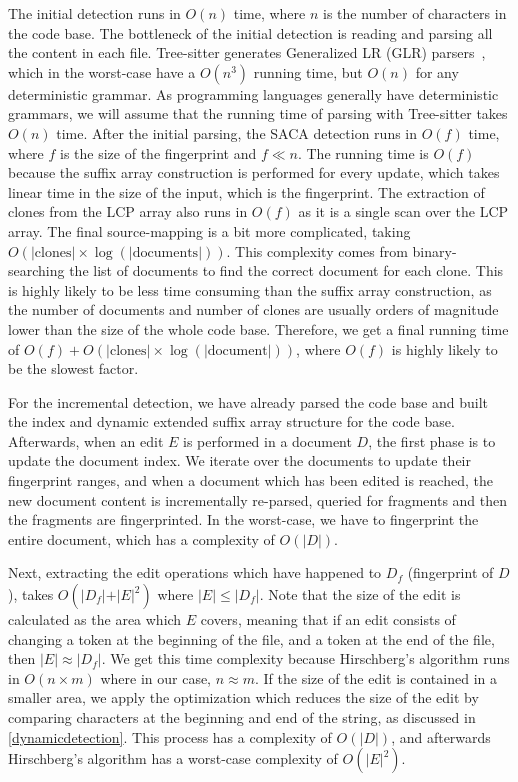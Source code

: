 The initial detection runs in $O(n)$ time, where $n$ is the number of characters in the
code base. The bottleneck of the initial detection is reading and parsing all the content
in each file. Tree-sitter generates Generalized LR (GLR) parsers~\cite{GLR}, which in the
worst-case have a $O(n^3)$ running time, but $O(n)$ for any deterministic grammar. As
programming languages generally have deterministic grammars, we will assume that the
running time of parsing with Tree-sitter takes $O(n)$ time. After the initial parsing, the
SACA detection runs in $O(f)$ time, where $f$ is the size of the fingerprint and $f \ll
n$. The running time is $O(f)$ because the suffix array construction is performed for
every update, which takes linear time in the size of the input, which is the fingerprint.
The extraction of clones from the LCP array also runs in $O(f)$ as it is a single scan
over the LCP array. The final source-mapping is a bit more complicated, taking
$O(\vert\text{clones}\vert \times \log (\vert\text{documents}\vert))$. This complexity
comes from binary-searching the list of documents to find the correct document for each
clone. This is highly likely to be less time consuming than the suffix array construction,
as the number of documents and number of clones are usually orders of magnitude lower than
the size of the whole code base. Therefore, we get a final running time of $O(f) +
O(\vert\text{clones}\vert \times \log(\vert\text{document}\vert))$, where $O(f)$ is highly
likely to be the slowest factor.

For the incremental detection, we have already parsed the code base and built the index
and dynamic extended suffix array structure for the code base. Afterwards, when an edit
$E$ is performed in a document $D$, the first phase is to update the document index. We
iterate over the documents to update their fingerprint ranges, and when a document which
has been edited is reached, the new document content is incrementally re-parsed, queried
for fragments and then the fragments are fingerprinted. In the worst-case, we have to
fingerprint the entire document, which has a complexity of $O(\vert D\vert)$.

Next, extracting the edit operations which have happened to $D_f$ (fingerprint of $D$),
takes $O(\vert D_f\vert + \vert E\vert^2)$ where $\vert E\vert \leq \vert D_f\vert$. Note
that the size of the edit is calculated as the area which $E$ covers, meaning that if an
edit consists of changing a token at the beginning of the file, and a token at the end of
the file, then $\vert E\vert \approx \vert D_f\vert$. We get this time complexity because
Hirschberg's algorithm runs in $O(n \times m)$ where in our case, $n \approx m$. If the
size of the edit is contained in a smaller area, we apply the optimization which reduces
the size of the edit by comparing characters at the beginning and end of the string, as
discussed in \cref{dynamicdetection}. This process has a complexity of $O(\vert D\vert)$,
and afterwards Hirschberg's algorithm has a worst-case complexity of $O(\vert E\vert^2)$.

